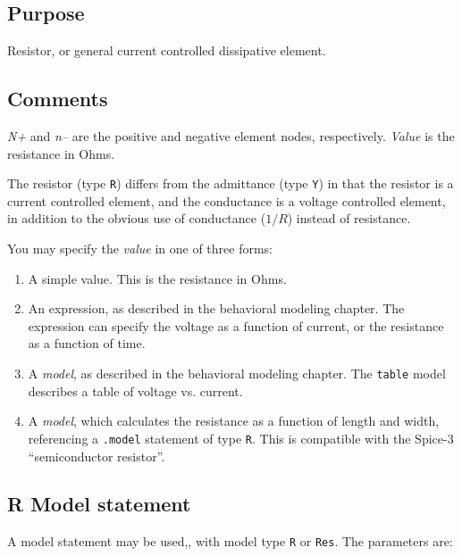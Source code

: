 \subsection{Purpose}

Resistor, or general current controlled dissipative element.
\subsection{Comments}

{\it N+} and {\it n--} are the positive and negative element nodes,
respectively.  {\it Value} is the resistance in Ohms.

The resistor (type {\tt R}) differs from the admittance (type {\tt Y}) in
that the resistor is a current controlled element, and the conductance is a
voltage controlled element, in addition to the obvious use of conductance
($1/R$) instead of resistance.

You may specify the {\it value} in one of three forms:

\begin{enumerate}
  
\item
A simple value.  This is the resistance in Ohms.
  
\item
An expression, as described in the behavioral modeling chapter.  The
expression can specify the voltage as a function of current, or the
resistance as a function of time.

\item
A {\it model}, as described in the behavioral modeling chapter.  The
{\tt table} model describes a table of voltage vs. current.
  
\item
A {\it model}, which calculates the resistance as a function of length
and width, referencing a {\tt .model} statement of type {\tt R}.  This
is compatible with the Spice-3 ``semiconductor resistor''.

\end{enumerate}
\subsection{R Model statement}

A model statement may be used,, with model type {\tt R} or {\tt Res}.
The parameters are:

